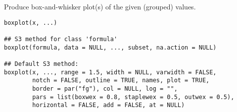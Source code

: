 %
\begin{Description}\relax
Produce box-and-whisker plot(s) of the given (grouped) values.
\end{Description}
%
\begin{Usage}
\begin{verbatim}
boxplot(x, ...)

## S3 method for class 'formula'
boxplot(formula, data = NULL, ..., subset, na.action = NULL)

## Default S3 method:
boxplot(x, ..., range = 1.5, width = NULL, varwidth = FALSE,
        notch = FALSE, outline = TRUE, names, plot = TRUE,
        border = par("fg"), col = NULL, log = "",
        pars = list(boxwex = 0.8, staplewex = 0.5, outwex = 0.5),
        horizontal = FALSE, add = FALSE, at = NULL)
\end{verbatim}
\end{Usage}
%
